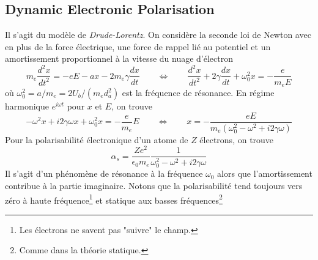 \newpage
\subsection{Dynamic Electronic Polarisation}
Il s'agit du modèle de \textit{Drude-Lorentz}. On considère la seconde loi de Newton avec en plus de 
la force électrique, une force de rappel lié au potentiel et un amortissement proportionnel à la 
vitesse du nuage d'électron
\begin{equation}
m_e\dfrac{d^2x}{dt^2} = -eE-ax-2m_e\gamma\dfrac{dx}{dt}\qquad\Leftrightarrow\qquad
\dfrac{d^2x}{dt^2}+2\gamma\dfrac{dx}{dt}+\omega_0^2x=-\dfrac{e}{m_eE}
\end{equation}
où $\omega_0^2 = a/m_e = 2U_b/(m_ed_a^2)$ est la fréquence de résonance. En régime harmonique 
$e^{i\omega t}$ pour $x$ et $E$, on trouve
\begin{equation}
-\omega^2x+i2\gamma\omega x + \omega_0^2x = -\dfrac{e}{m_e}E\qquad\Leftrightarrow\qquad
x=-\dfrac{eE}{m_e(\omega_0^2-\omega^2+i2\gamma\omega)}
\end{equation}
Pour la polarisabilité électronique d'un atome de $Z$ électrons, on trouve
\begin{equation}
\alpha_s = \dfrac{Ze^2}{\epsilon_0m_e}\dfrac{1}{\omega_0^2-\omega^2+i2\gamma\omega}
\end{equation}
Il s'agit d'un phénomène de résonance à la fréquence $\omega_0$ alors que l’amortissement 
contribue à la partie imaginaire. Notons que la polarisabilité tend toujours vers zéro à haute
fréquence\footnote{Les électrons ne savent pas "suivre" le champ.} et statique aux basses
fréquences\footnote{Comme dans la théorie statique.}


